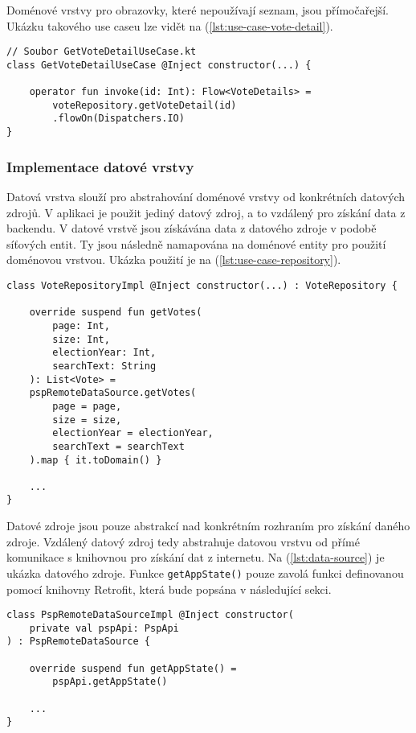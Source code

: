 \noindent Doménové vrstvy pro obrazovky, které nepoužívají seznam, jsou přímočařejší. Ukázku takového use caseu lze vidět na (\ref{lst:use-case-vote-detail}).

\begin{lstlisting}[caption={Ukázka využití use caseu pro získání detailu hlasování}, label={lst:use-case-vote-detail}, tabsize=2]
// Soubor GetVoteDetailUseCase.kt
class GetVoteDetailUseCase @Inject constructor(...) {
	
	operator fun invoke(id: Int): Flow<VoteDetails> =
		voteRepository.getVoteDetail(id)
		.flowOn(Dispatchers.IO)	
}
\end{lstlisting}

\subsubsection*{Implementace datové vrstvy}
Datová vrstva slouží pro abstrahování doménové vrstvy od konkrétních datových zdrojů. V aplikaci je použit jediný datový zdroj, a to vzdálený pro získání data z backendu. V datové vrstvě jsou získávána data z datového zdroje v podobě síťových entit. Ty jsou následně namapována na doménové entity pro použití doménovou vrstvou. Ukázka použití je na (\ref{lst:use-case-repository}).

\begin{lstlisting}[caption={Ukázka datové vrstvy pro data o hlasováních}, label={lst:use-case-repository}, tabsize=2]
class VoteRepositoryImpl @Inject constructor(...) : VoteRepository {
	
	override suspend fun getVotes(
		page: Int,
		size: Int,
		electionYear: Int,
		searchText: String
	): List<Vote> =
	pspRemoteDataSource.getVotes(
		page = page,
		size = size,
		electionYear = electionYear,
		searchText = searchText
	).map { it.toDomain() }
	
	...
}
\end{lstlisting}

\vspace{10px}
\noindent Datové zdroje jsou pouze abstrakcí nad konkrétním rozhraním pro získání daného zdroje. Vzdálený datový zdroj tedy abstrahuje datovou vrstvu od přímé komunikace s knihovnou pro získání dat z internetu. Na (\ref{lst:data-source}) je ukázka datového zdroje. Funkce \lstinline|getAppState()| pouze zavolá funkci definovanou pomocí knihovny Retrofit, která bude popsána v následující sekci.

\begin{lstlisting}[caption={Ukázka datového zdroje}, label={lst:data-source}, tabsize=2]
class PspRemoteDataSourceImpl @Inject constructor(
	private val pspApi: PspApi
) : PspRemoteDataSource {
	
	override suspend fun getAppState() = 
		pspApi.getAppState()
		
	...
}
\end{lstlisting}

